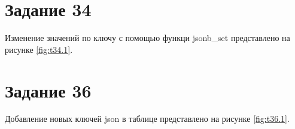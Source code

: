 \begin{myfigure}{32.3}
  \caption{Операции с массивами, часть 3}
  \label{fig:t32.3}
\end{myfigure}

\section{Задание 34}

Изменение значений по ключу с помощью функци jsonb\_set представлено на рисунке \ref{fig:t34.1}.

\begin{myfigure}{34.1}
  \caption{Применение jsonb\_set}
  \label{fig:t34.1}
\end{myfigure}

\section{Задание 36}

Добавление новых ключей json в таблице представлено на рисунке \ref{fig:t36.1}.

\begin{myfigure}{36.1}
  \caption{Добавление новых ключей}
  \label{fig:t36.1}
\end{myfigure}
